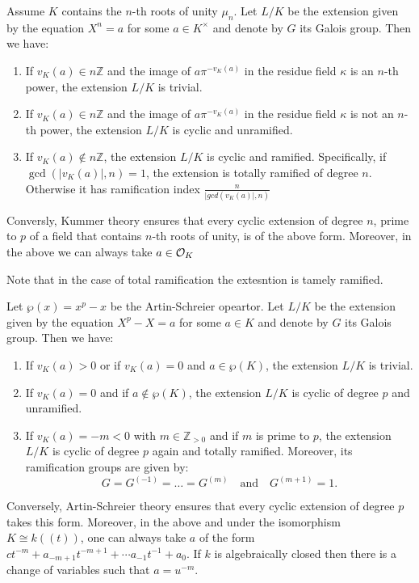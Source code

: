 \begin{theorem}\label{theorem:kummer_ramification:reorg}
Assume $K$ contains the $n$-th roots of unity $\mu_n$. 
Let $L/K$ be the extension given by the equation $X^n = a$ for some 
$a \in K^\times$ and denote by $G$ its Galois group. Then we have:

\begin{enumerate}
    \item If $v_K(a) \in n\mathbb{Z}$ and the image of $a\pi^{-v_K(a)}$ in the residue field $\kappa$ is an $n$-th power, the extension $L/K$ is trivial.
    \item If $v_K(a) \in n\mathbb{Z}$ and the image of $a\pi^{-v_K(a)}$ in the residue field $\kappa$ is not an $n$-th power, the extension $L/K$ is cyclic and unramified.
    \item If $v_K(a) \notin n\mathbb{Z}$, the extension $L/K$ is cyclic and ramified. Specifically, if $\gcd(|v_K(a)|, n) = 1$, the extension is totally ramified of degree $n$.
     Otherwise it has ramification index $\frac{n}{|gcd(v_K(a)|, n)}$
\end{enumerate}
Conversly, Kummer theory ensures that every cyclic extension of degree $n$, prime to $p$ of a field that contains $n$-th roots of unity, is of the above form.
Moreover, in the above we can always take $a \in \mathcal{O}_K$
\end{theorem}
Note that in the case of total ramification the extesntion is tamely ramified.


\begin{theorem}\label{theorem:artin_schreier_ramification:reorg}
Let $\wp(x) = x^p - x$ be the Artin-Schreier opeartor.
Let $L/K$ be the extension given by the equation $X^p - X = a$ for some $a \in K$ and denote by $G$ its Galois group. 
Then we have:
\begin{enumerate}
    \item If $v_K(a) > 0$ or if $v_K(a) = 0$ and $a \in \wp(K)$, the extension $L/K$ is trivial.
    \item If $v_K(a) = 0$ and if $a \notin \wp(K)$, the extension $L/K$ is cyclic of degree $p$ and unramified.
    \item If $v_K(a) = -m < 0$ with $m \in \mathbb{Z}_{>0}$ and if $m$ is prime to $p$, the extension $L/K$ is cyclic of degree $p$ again and totally ramified. Moreover,
     its ramification groups are given by:
     $$G = G^{(-1)} = \dots = G^{(m)} \quad \text{and} \quad G^{(m+1)} = 1.$$
\end{enumerate}
Conversely, Artin-Schreier theory ensures that every cyclic extension of degree $p$ takes this form.
Moreover, in the above and under the isomorphism $K \cong k((t))$, one can always take $a$ of the form 
$c t^{-m} + a_{-m + 1} t^{-m + 1} + \cdots a_{-1}t^{-1} + a_0$. If $k$ is algebraically closed then there is a 
change of variables such that $a=u^{-m}$.
\end{theorem}


